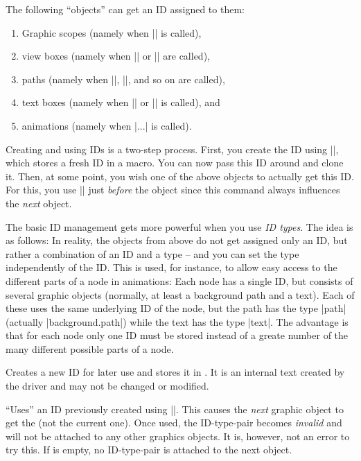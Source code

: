 The following ``objects'' can get an ID assigned to them:
\begin{enumerate}
\item Graphic scopes (namely when |\pgfsys@begin@idscope| is called),
\item view boxes (namely when |\pgfsys@viewboxmeet| or |\pgfsys@viewboxslice| are called),
\item paths (namely when |\pgfsys@fill|, |\pgfsys@stroke|, and so on are called),
\item text boxes (namely when |\pgfsys@hbox| or |\pgfsys@hboxsynced| is called), and
\item animations (namely when |\pgfsys@animate...| is called).
\end{enumerate}

Creating and using IDs is a two-step process. First, you create the
ID using |\pgfsys@new@id|, which stores a fresh ID in a macro. You can
now pass this ID around and clone it. Then, at some point, you wish
one of the above objects to actually get this ID. For this, you use
|\pgfsys@use@id| just \emph{before} the object since this command
always influences the \emph{next} object.

The basic ID management gets more powerful when you use \emph{ID
  types}. The idea is as follows: In reality, the objects from above
do not get assigned only an ID, but rather a combination of an ID and
a type -- and you can set the type independently of the ID. This is
used, for instance, to allow easy access to the different parts of a
node in animations: Each node has a single ID, but consists of several
graphic objects (normally, at least a background path and a
text). Each of these uses the same underlying ID of the node, but the
path has the type |path| (actually |background.path|) while the text
has the type |text|. The advantage is that for each node only one ID
must be stored instead of a greate number of the many different
possible parts of a node.

\begin{command}{\pgfsys@new@id{}}
  Creates a new ID for later use and stores it in . It is
  an internal text created by the driver and may not be changed or
  modified. 
\end{command}

\begin{command}{\pgfsys@use@id{}}
  ``Uses'' an ID previously created using |\pgfsys@new@id|. This
  causes the \emph{next} graphic object to get the  (not the
  current one). Once used, the ID-type-pair becomes \emph{invalid} and
  will not be attached to any other graphics objects. It is, however,
  not an error to try this. If  is empty, no ID-type-pair is
  attached to the next object.
\end{command}

